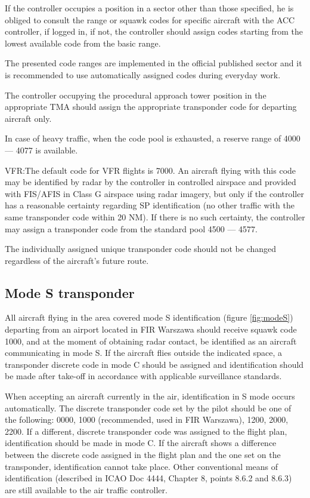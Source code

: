 If the controller occupies a position in a sector other than those specified, he is obliged to consult the range or squawk codes for specific aircraft with the ACC controller, if logged in, if not, the controller should assign codes starting from the lowest available code from the basic range.

The presented code ranges are implemented in the official published sector and it is recommended to use automatically assigned codes during everyday work.

The controller occupying the procedural approach tower position in the appropriate TMA should assign the appropriate transponder code for departing aircraft only.

In case of heavy traffic, when the code pool is exhausted, a reserve range of 4000 --- 4077 is available.

VFR:\@ The default code for VFR flights is 7000. An aircraft flying with this code may be identified by radar by the controller in controlled airspace and provided with FIS/AFIS in Class G airspace using radar imagery, but only if the controller has a reasonable certainty regarding SP identification (no other traffic with the same transponder code within 20 NM). If there is no such certainty, the controller may assign a transponder code from the standard pool 4500 --- 4577.

The individually assigned unique transponder code should not be changed regardless of the aircraft's future route.

\subsection{Mode S transponder}

All aircraft flying in the area covered mode S identification (figure \ref{fig:modeS}) departing from an airport located in FIR Warszawa should receive squawk code 1000, and at the moment of obtaining radar contact, be identified as an aircraft communicating in mode S. If the aircraft flies outside the indicated space, a transponder discrete code in mode C should be assigned and identification should be made after take-off in accordance with applicable surveillance standards.

When accepting an aircraft currently in the air, identification in S mode occurs automatically. The discrete transponder code set by the pilot should be one of the following: 0000, 1000 (recommended, used in FIR Warszawa), 1200, 2000, 2200. If a different, discrete transponder code was assigned to the flight plan, identification should be made in mode C. If the aircraft shows a difference between the discrete code assigned in the flight plan and the one set on the transponder, identification cannot take place. Other conventional means of identification (described in ICAO Doc 4444, Chapter 8, points 8.6.2 and 8.6.3) are still available to the air traffic controller.

